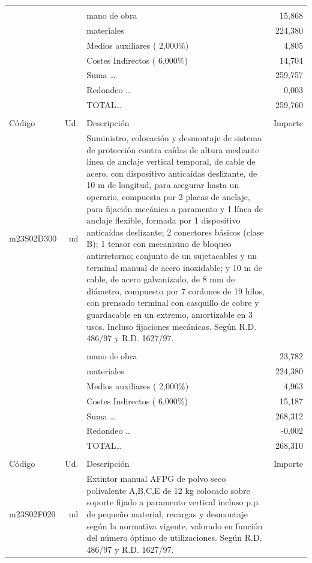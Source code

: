 \begin{supertabular}{l r p{60mm} r}
&&&\\%
&&mano de obra&    15,868\\%
&&materiales&   224,380\\%
&&Medios auxiliares (     2,000\%)&     4,805\\%
&&Costes Indirectos (     6,000\%)&    14,704\\%
&&Suma \ldots&   259,757\\%
&&Redondeo \ldots&     0,003\\%
%
&&TOTAL\ldots&   259,760\\%
&&&\\%
Código&Ud.&Descripción&Importe\\%
\hline%
m23S02D300&ud&Suministro, colocación y desmontaje de sistema de protección contra caídas de altura mediante línea de anclaje vertical temporal, de cable de acero, con dispositivo anticaídas deslizante, de 10 m de longitud, para asegurar hasta un operario, compuesta por 2 placas de anclaje, para fijación mecánica a paramento y 1 línea de anclaje flexible, formada por 1 dispositivo anticaídas deslizante; 2 conectores básicos (clase B); 1 tensor con mecanismo de bloqueo antirretorno; conjunto de un sujetacables y un terminal manual de acero inoxidable; y 10 m de cable, de acero galvanizado, de 8 mm de diámetro, compuesto por 7 cordones de 19 hilos, con prensado terminal con casquillo de cobre y guardacable en un extremo, amortizable en 3 usos. Incluso fijaciones mecánicas. Según R.D. 486/97 y R.D. 1627/97.&\\%
&&&\\%
&&mano de obra&    23,782\\%
&&materiales&   224,380\\%
&&Medios auxiliares (     2,000\%)&     4,963\\%
&&Costes Indirectos (     6,000\%)&    15,187\\%
&&Suma \ldots&   268,312\\%
&&Redondeo \ldots&    {-}0,002\\%
%
&&TOTAL\ldots&   268,310\\%
&&&\\%
Código&Ud.&Descripción&Importe\\%
\hline%
m23S02F020&ud&Extintor manual AFPG de polvo seco polivalente A,B,C,E de 12 kg colocado sobre soporte fijado a paramento vertical incluso p.p. de pequeño material, recargas y desmontaje según la normativa vigente, valorado en función del número óptimo de utilizaciones. Según R.D. 486/97 y R.D. 1627/97.&\\%

\end{supertabular}
